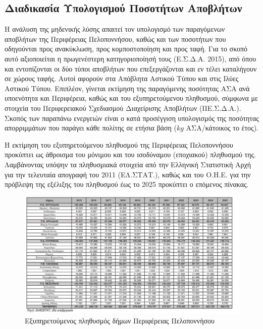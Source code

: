 \documentclass[12pt]{article}
\begin{document}
	\subsection{Διαδικασία Υπολογισμού Ποσοτήτων Αποβλήτων}
	
	Η ανάλυση της μηδενικής λύσης απαιτεί τον υπολογισμό των παραγόμενων αποβλήτων της Περιφέρειας Πελοποννήσου, καθώς και των ποσοτήτων που οδηγούνται προς ανακύκλωση, προς κομποστοποίηση και προς ταφή. Για το σκοπό αυτό αξιοποιείται η πρωγενέστερη κατηγοριοποίησή τους (Ε.Σ.Δ.Α. 2015), από όπου και εντοπίζονται οι δύο τύποι αποβλήτων που επεξεργάζονται και εν τέλει καταλήγουν σε χώρους ταφής. Αυτοί αφορούν στα Απόβλητα Αστικού Τύπου και στις Ιλύες Αστικού Τύπου. Επιπλέον, γίνεται εκτίμηση της παραγόμενης ποσότητας ΑΣΑ ανά υποενότητα και Περιφέρεια, καθώς και του εξυπηρετούμενου πληθυσμού, σύμφωνα με στοιχεία του Περιφερειακού Σχεδιασμού Διαχείρισης Αποβλήτων (ΠΕ.Σ.Δ.Α.). Σκοπός των παραπάνω ενεργειών είναι ο κατά προσέγγιση υπολογισμός της ποσότητας απορριμμάτων που παράγει κάθε πολίτης σε ετήσια βάση ($kg$ ΑΣΑ/κάτοικος το έτος).
	
	Η εκτίμηση του εξυπηρετούμενου πληθυσμού της Περιφέρειας Πελοποννήσου προκύπτει ως άθροισμα του μόνιμου και του ισοδύναμου (εποχιακού) πληθυσμού της. Λαμβάνοντας υπόψην τα πληθυσμιακά στοιχεία από την Ελληνική Στατιστική Αρχή για την τελευταία απογραφή του 2011 (ΕΛ.ΣΤΑΤ.), καθώς και του Ο.Η.Ε. για την πρόβλεψη της εξέλιξης του πληθυσμού έως το 2025 προκύπτει ο επόμενος πίνακας.
	
	\begin{figure} [H]
		\begin{center}
			\includegraphics [scale = 0.50] {table12.png}
			\caption{Εξυπηρετούμενος πληθυσμός δήμων Περιφέρειας Πελοποννήσου}
		\end{center}
	\end{figure}
\end{document}
